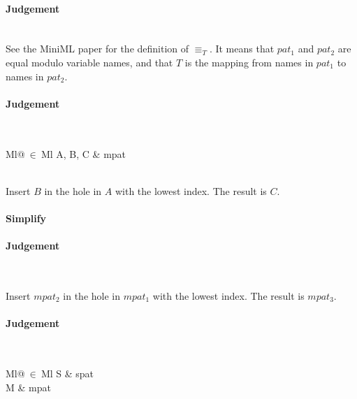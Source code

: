 \paragraph{Judgement} \\

See the MiniML paper for the definition of $\equiv_T$. It means that $pat_1$ and $pat_2$
are equal modulo variable names, and that $T$ is the mapping from names in $pat_1$
to names in $pat_2$.

\clearpage


\paragraph{Judgement} \\
\indent\begin{tabular}{Ml@{$\ \in\ $}Ml}
  A, B, C & mpat
\end{tabular}\\

Insert $B$ in the hole in $A$ with the lowest index. The result is $C$.


\paragraph{Simplify}

\paragraph{Judgement} \\


Insert $mpat_2$ in the hole in $mpat_1$ with the lowest index. The result is
$mpat_3$.

\clearpage

\paragraph{Judgement} \\
\indent\begin{tabular}{Ml@{$\ \in\ $}Ml}
  S & spat\\
  M & mpat
\end{tabular}\\

